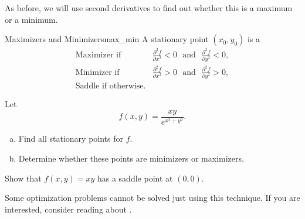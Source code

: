                         As before, we will use second derivatives to find out whether this is a maximum or a minimum.

                        \begin{prop}{Maximizers and Minimizers}{max_min}
                        A stationary point $(x_0,y_0)$ is a
                        \begin{align*}
                            \textrm{Maximizer if~ }& \frac{\partial^2 f}{\partial x^2} <0 \textrm{ ~and~ } \frac{\partial^2 f}{\partial y^2}<0,\\
                            \textrm{Minimizer if~ }& \frac{\partial^2 f}{\partial x^2} >0 \textrm{ ~and~ } \frac{\partial^2 f}{\partial y^2}>0,\\
                            \textrm{Saddle if otherwise.}
                        \end{align*}
                        \end{prop}

                        \begin{exercise}
                        Let
                        \[
                        f(x,y) = \frac{xy}{e^{x^2+y^2}}.
                        \]
                        \begin{enumerate}[(a)]
                            \item Find all stationary points for $f$.
                            \item Determine whether these points are minimizers or maximizers.
                        \end{enumerate}
                        \end{exercise}

                        \begin{exercise}
                        Show that $f(x,y)=xy$ has a saddle point at $(0,0)$.
                        \end{exercise}

                        Some optimization problems cannot be solved just using this technique.  If you are interested, consider reading about .

